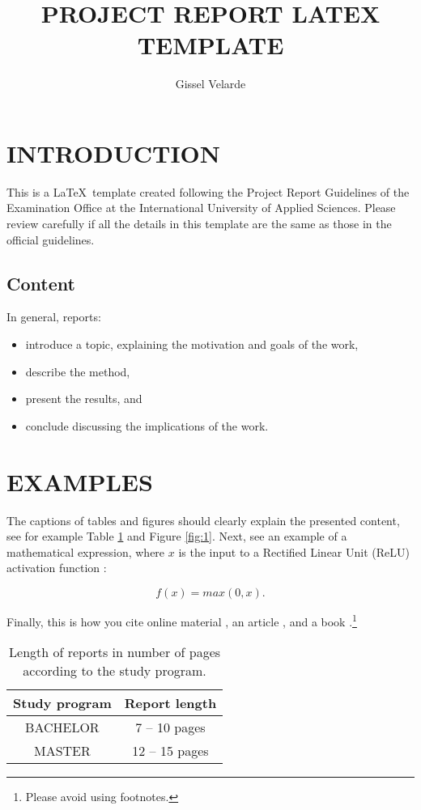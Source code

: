 \documentclass[11pt,a4paper]{article}
\title{PROJECT REPORT LATEX TEMPLATE}
\author{ Gissel Velarde }
\begin{document}
\maketitle	

 \tableofcontents
 \pagebreak

\section{INTRODUCTION}
This is a \LaTeX\  template created following the Project Report Guidelines of the Examination Office at the International University of Applied Sciences. Please review carefully if all the details in this template are the same as those in the official guidelines. 

\subsection{Content}
In general, reports:

\begin{itemize}
\item introduce a topic, explaining the motivation and goals of the work, 
\item describe the method, 
\item  present the results, and
\item conclude discussing the implications of the work.
\end{itemize}

\section{EXAMPLES}
The captions of tables and figures should clearly explain the presented content, see for example Table \ref{table:1} and Figure \ref{fig:1}. Next, see an example of a mathematical expression, where $x$ is the input to a Rectified Linear Unit (ReLU) activation function :

\begin{equation} \label{e:1}
f(x)=max(0,x). 
\end{equation}

Finally, this is how you cite online material , an article , and a book .\footnote{Please avoid using footnotes.} 

\begin{table}[h!]
\centering
\begin{tabular}{|c c|} 
 \hline
Study program &  Report length \\  \hline
BACHELOR &  7 -- 10  pages  \\ 
MASTER  & 12 -- 15 pages\\

 \hline
\end{tabular}
\caption{Length of reports in number of pages according to the study program.}
\label{table:1}
\end{table}
\end{document}
